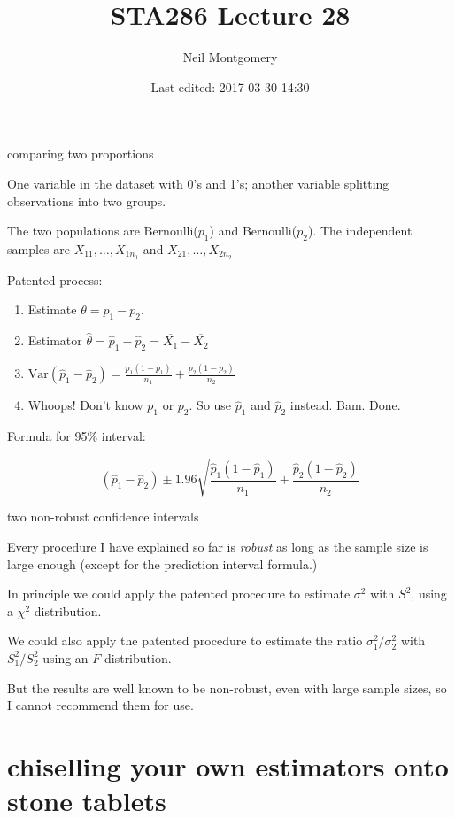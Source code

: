 \documentclass[ignorenonframetext,aspectratio=169]{beamer}
\title{STA286 Lecture 28}
\author{Neil Montgomery}
\date{Last edited: 2017-03-30 14:30}
\newcommand\V[1]{\text{Var}\!\left(#1\right)}
\newcommand\ol{\overline}
\begin{document}
\frame{\titlepage}

\begin{frame}{comparing two proportions}

One variable in the dataset with 0's and 1's; another variable splitting
observations into two groups.

The two populations are Bernoulli(\(p_1\)) and Bernoulli(\(p_2\)). The
independent samples are \(X_{11},\ldots,X_{1n_1}\) and
\(X_{21},\ldots,X_{2n_2}\)

Patented process:

\begin{enumerate}[<+->]
\def\labelenumi{\arabic{enumi}.}
\item
  Estimate \(\theta = p_1 - p_2\).
\item
  Estimator \(\hat\theta = \hat p_1 - \hat p_2 = \ol{X_1} - \ol{X_2}\)
\item
  \(\V{\hat p_1 - \hat p_2} = \frac{p_1(1-p_1)}{n_1} + \frac{p_2(1-p_2)}{n_2}\)
\item
  Whoops! Don't know \(p_1\) or \(p_2\). So use \(\hat p_1\) and
  \(\hat p_2\) instead. Bam. Done.
\end{enumerate}

\pause Formula for 95\% interval:

\[(\hat p_1 - \hat p_2) \pm 1.96\sqrt{\frac{\hat p_1(1-\hat p_1)}{n_1} + \frac{\hat p_2(1- \hat p_2)}{n_2}}\]

\end{frame}

\begin{frame}{two non-robust confidence intervals}

Every procedure I have explained so far is \textit{robust} as long as
the sample size is large enough (except for the prediction interval
formula.)

In principle we could apply the patented procedure to estimate
\(\sigma^2\) with \(S^2\), using a \(\chi^2\) distribution.

We could also apply the patented procedure to estimate the ratio
\(\sigma_1^2/\sigma_2^2\) with \(S_1^2/S_2^2\) using an \(F\)
distribution.

But the results are well known to be non-robust, even with large sample
sizes, so I cannot recommend them for use.

\end{frame}

\section{chiselling your own estimators onto stone
tablets}\label{chiselling-your-own-estimators-onto-stone-tablets}
\end{document}

